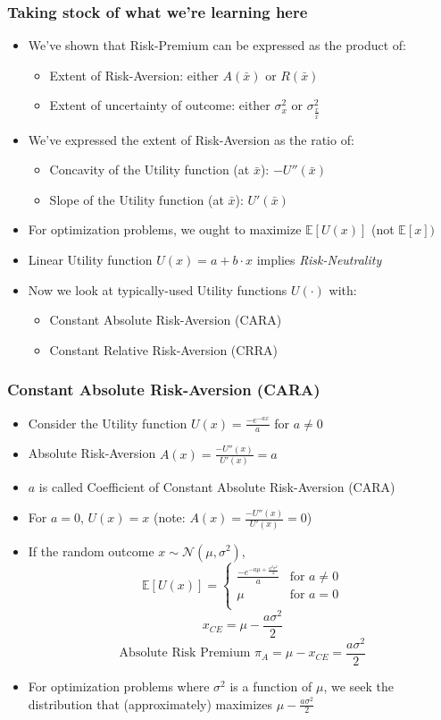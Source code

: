 \documentclass[handout]{beamer}
\begin{document}
\begin{frame}
\frametitle{Taking stock of what we're learning here}
\pause
\begin{itemize}[<+->]
\item We've shown that Risk-Premium can be expressed as the product of:
\begin{itemize}
\item Extent of Risk-Aversion: either $A(\bar{x})$ or $R(\bar{x})$
\item Extent of uncertainty of outcome: either $\sigma_x^2$ or $\sigma_{\frac {x} {\bar{x}}}^2$
\end{itemize}
\item We've expressed the extent of Risk-Aversion as the ratio of:
\begin{itemize}
\item Concavity of the Utility function (at $\bar{x}$): $-U''(\bar{x})$
\item Slope of the Utility function (at $\bar{x}$): $U'(\bar{x})$
\end{itemize}
\item For optimization problems, we ought to maximize $\mathbb{E}[U(x)]$ (not $\mathbb{E}[x])$
\item Linear Utility function $U(x) = a + b \cdot x$ implies {\em Risk-Neutrality}
\item Now we look at typically-used Utility functions $U(\cdot)$ with:
\begin{itemize}
\item Constant Absolute Risk-Aversion (CARA)
\item Constant Relative Risk-Aversion (CRRA)
\end{itemize}
\end{itemize}
\end{frame}

\begin{frame}
\frametitle{Constant Absolute Risk-Aversion (CARA)}
\pause
\begin{itemize}[<+->]
\item Consider the Utility function $U(x) = \frac {-e^{-ax}} {a}$ for $a \neq 0$
\item Absolute Risk-Aversion $A(x) = \frac {-U''(x)} {U'(x)} = a$
\item $a$ is called Coefficient of Constant Absolute Risk-Aversion (CARA)
\item For $a=0$, $U(x) = x$ (note: $A(x) = \frac {-U''(x)} {U'(x)} = 0$)
\item If the random outcome $x \sim \mathcal{N}(\mu, \sigma^2)$,
$$
\mathbb{E}[U(x)] = 
\begin{cases}
\frac {- e^{-a \mu + \frac {a^2 \sigma^2} 2}} a & \text{for } a \neq 0\\
\mu & \text {for } a = 0\\
\end{cases}
$$
$$x_{CE} = \mu - \frac {a \sigma^2} 2$$
$$\mbox{Absolute Risk Premium } \pi_A = \mu - x_{CE} =  \frac {a \sigma^2} 2$$
\item For optimization problems where $\sigma^2$ is a function of $\mu$, we seek the distribution that (approximately) maximizes $\mu - \frac {a \sigma^2} 2$
\end{itemize}
\end{frame}
\end{document}
